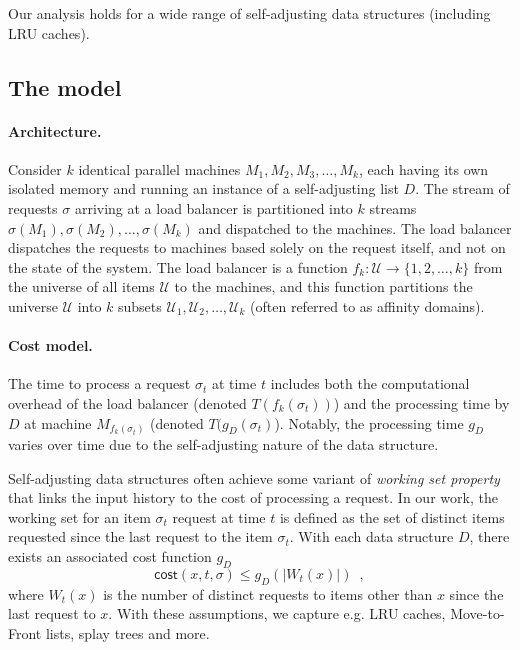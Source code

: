 Our analysis holds for a wide range of self-adjusting data structures (including LRU caches).

\subsection{The model}
\label{sec:app:model}

\paragraph{Architecture.}

Consider $k$ identical parallel machines $M_1, M_2, M_3, \ldots, M_k$, each having its own isolated memory and running an instance of a self-adjusting list $D$.
The stream of requests $\sigma$ arriving at a load balancer is partitioned into $k$ streams $\sigma(M_1), \sigma(M_2), \ldots, \sigma(M_k)$ and dispatched to the machines.
The load balancer dispatches the requests to machines based solely on the request itself, and not on the state of the system.
The load balancer is a function $f_k : \mathcal{U} \to \{1, 2, \ldots, k\}$ from the universe of all items $\mathcal{U}$ to the machines, and this function partitions the universe $\mathcal{U}$ into $k$ subsets $\mathcal{U}_1, \mathcal{U}_2, \ldots, \mathcal{U}_k$ (often referred to as affinity domains).

\paragraph{Cost model.}

The time to process a request $\sigma_t$ at time $t$ includes both the computational overhead of the load balancer (denoted $T(f_k(\sigma_t))$) and the processing time by $D$ at machine $M_{f_k(\sigma_t)}$ (denoted $T(g_D(\sigma_t)$).
Notably, the processing time $g_D$ varies over time due to the self-adjusting nature of the data structure.

Self-adjusting data structures often achieve some variant of \emph{working set property} that links the input history to the cost of processing a request.
In our work, the working set for an item $\sigma_t$ request at time $t$ is defined as the set of distinct items requested since the last request to the item $\sigma_t$.
With each data structure $D$, there exists an associated cost function $g_D$ 
\[
	\textsf{cost}(x, t, \sigma) \le g_D(|W_t(x)|) \enspace ,
\]
where $W_t(x)$ is the number of distinct requests to items other than $x$ since the last request to $x$.
With these assumptions, we capture e.g. LRU caches, Move-to-Front lists, splay trees and more. 




